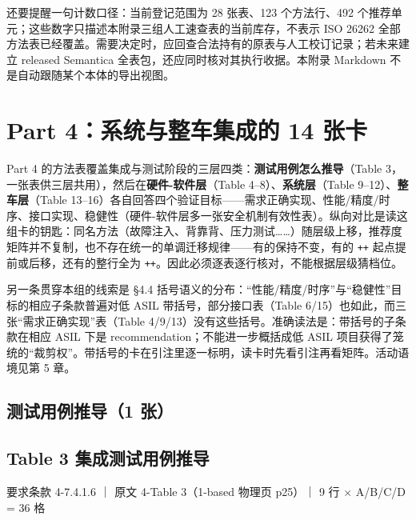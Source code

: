 还要提醒一句计数口径：当前登记范围为 28 张表、123 个方法行、492 个推荐单元；这些数字只描述本附录三组人工速查表的当前库存，不表示 ISO 26262 全部方法表已经覆盖。需要决定时，应回查合法持有的原表与人工校订记录；若未来建立 released Semantica 全表包，还应同时核对其执行收据。本附录 Markdown 不是自动跟随某个本体的导出视图。

\section{Part 4：系统与整车集成的 14 张卡}

Part 4 的方法表覆盖集成与测试阶段的三层四类：\textbf{测试用例怎么推导}（Table 3，一张表供三层共用），然后在\textbf{硬件-软件层}（Table 4–8）、\textbf{系统层}（Table 9–12）、\textbf{整车层}（Table 13–16）各自回答四个验证目标——需求正确实现、性能/精度/时序、接口实现、稳健性（硬件-软件层多一张安全机制有效性表）。纵向对比是读这组卡的钥匙：同名方法（故障注入、背靠背、压力测试\ldots{}\ldots{}）随层级上移，推荐度矩阵并不复制，也不存在统一的单调迁移规律——有的保持不变，有的 \nolinkurl{++} 起点提前或后移，还有的整行全为 \nolinkurl{++}。因此必须逐表逐行核对，不能根据层级猜档位。

另一条贯穿本组的线索是 §4.4 括号语义的分布：“性能/精度/时序”与“稳健性”目标的相应子条款普遍对低 ASIL 带括号，部分接口表（Table 6/15）也如此，而三张“需求正确实现”表（Table 4/9/13）没有这些括号。准确读法是：带括号的子条款在相应 ASIL 下是 recommendation；不能进一步概括成低 ASIL 项目获得了笼统的“裁剪权”。带括号的卡在引注里逐一标明，读卡时先看引注再看矩阵。活动语境见第 5 章。

\subsection{测试用例推导（1 张）}

\subsection{Table 3 集成测试用例推导}

要求条款 4-7.4.1.6 ｜ 原文 4-Table 3（1-based 物理页 p25）｜ 9 行 \(\times\) A/B/C/D = 36 格

